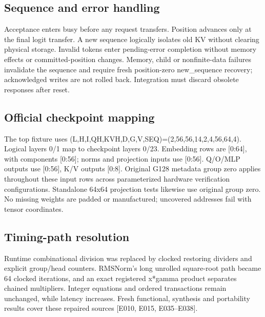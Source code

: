 \documentclass[11pt,a4paper]{article}
\begin{document}
\subsection{Sequence and error handling}

Acceptance enters busy before any request transfers. Position advances only at the final logit transfer. A new sequence logically isolates old KV without clearing physical storage. Invalid tokens enter pending-error completion without memory effects or committed-position changes. Memory,\allowbreak{} child or nonfinite-data failures invalidate the sequence and require fresh position-zero new\_\allowbreak{}sequence recovery; acknowledged writes are not rolled back. Integration must discard obsolete responses after reset.

\subsection{Official checkpoint mapping}

The top fixture uses (\allowbreak{}L,\allowbreak{}H,\allowbreak{}I,\allowbreak{}QH,\allowbreak{}KVH,\allowbreak{}D,\allowbreak{}G,\allowbreak{}V,\allowbreak{}SEQ)\allowbreak{}=\allowbreak{}(\allowbreak{}2,\allowbreak{}56,\allowbreak{}56,\allowbreak{}14,\allowbreak{}2,\allowbreak{}4,\allowbreak{}56,\allowbreak{}64,\allowbreak{}4)\allowbreak{}. Logical layers 0/\allowbreak{}1 map to checkpoint layers 0/\allowbreak{}23. Embedding rows are [\allowbreak{}0:64]\allowbreak{},\allowbreak{} with components [\allowbreak{}0:56]\allowbreak{}; norms and projection inputs use [\allowbreak{}0:56]\allowbreak{}. Q/\allowbreak{}O/\allowbreak{}MLP outputs use [\allowbreak{}0:56]\allowbreak{},\allowbreak{} K/\allowbreak{}V outputs [\allowbreak{}0:8]\allowbreak{}. Original G128 metadata group zero applies throughout these input rows across parameterized hardware verification configurations. Standalone 64x64 projection tests likewise use original group zero. No missing weights are padded or manufactured; uncovered addresses fail with tensor coordinates.

\subsection{Timing-path resolution}

Runtime combinational division was replaced by clocked restoring dividers and explicit group/\allowbreak{}head counters. RMSNorm's long unrolled square-root path became 64 clocked iterations,\allowbreak{} and an exact registered x*\allowbreak{}gamma product separates chained multipliers. Integer equations and ordered transactions remain unchanged,\allowbreak{} while latency increases. Fresh functional,\allowbreak{} synthesis and portability results cover these repaired sources [\allowbreak{}E010,\allowbreak{} E015,\allowbreak{} E035–E038]\allowbreak{}.
\end{document}
